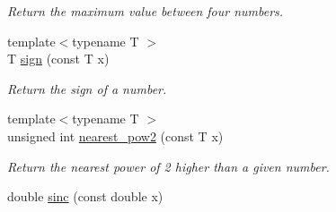 \begin{DoxyCompactItemize}
\begin{DoxyCompactList}\small\item\em Return the maximum value between four numbers. \item\end{DoxyCompactList}\item 
\hypertarget{namespacecimg__library_1_1cimg_acb00b9ea45d7c523af71071eaad2fd98}{
{\footnotesize template$<$typename T $>$ }\\T \hyperlink{namespacecimg__library_1_1cimg_acb00b9ea45d7c523af71071eaad2fd98}{sign} (const T x)}
\label{namespacecimg__library_1_1cimg_acb00b9ea45d7c523af71071eaad2fd98}

\begin{DoxyCompactList}\small\item\em Return the sign of a number. \item\end{DoxyCompactList}\item 
\hypertarget{namespacecimg__library_1_1cimg_acf8d12c40f9e4b9c779fb4e4ff299b27}{
{\footnotesize template$<$typename T $>$ }\\unsigned int \hyperlink{namespacecimg__library_1_1cimg_acf8d12c40f9e4b9c779fb4e4ff299b27}{nearest\_\-pow2} (const T x)}
\label{namespacecimg__library_1_1cimg_acf8d12c40f9e4b9c779fb4e4ff299b27}

\begin{DoxyCompactList}\small\item\em Return the nearest power of 2 higher than a given number. \item\end{DoxyCompactList}\item 
\hypertarget{namespacecimg__library_1_1cimg_ac63d9541ded9f3976b33abf91359cc96}{
double \hyperlink{namespacecimg__library_1_1cimg_ac63d9541ded9f3976b33abf91359cc96}{sinc} (const double x)}
\label{namespacecimg__library_1_1cimg_ac63d9541ded9f3976b33abf91359cc96}


\end{DoxyCompactItemize}
